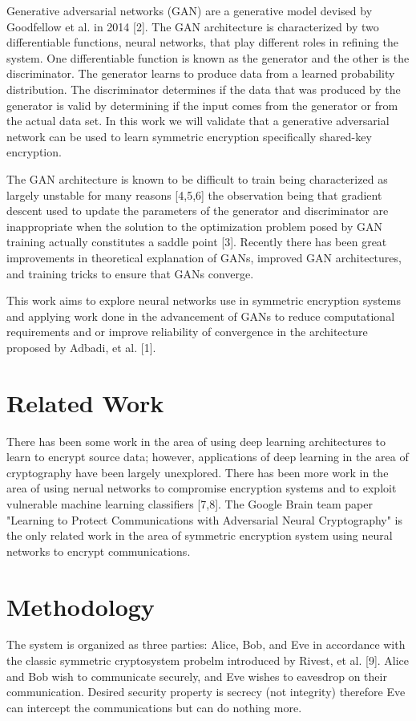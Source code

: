 \documentclass[12pt]{article}
\begin{document}
Generative adversarial networks (GAN) are a generative model devised by Goodfellow et al. in 2014 [2]. The GAN architecture is characterized by two differentiable functions, neural networks, that play different roles in refining the system. One differentiable function is known as the generator and the other is the discriminator. The generator learns to produce data from a learned probability distribution. The discriminator determines if the data that was produced by the generator is valid by determining if the input comes from the generator or from the actual data set. In this work we will validate that a generative adversarial network can be used to learn symmetric encryption specifically shared-key encryption.

The GAN architecture is known to be difficult to train being characterized as largely unstable for many reasons [4,5,6] the observation being that gradient descent used to update the parameters of the generator and discriminator are inappropriate when the solution to the optimization problem posed by GAN training actually constitutes a saddle point [3]. Recently there has been great improvements in theoretical explanation of GANs, improved GAN architectures, and training tricks to ensure that GANs converge.

This work aims to explore neural networks use in symmetric encryption systems and applying work done in the advancement of GANs to reduce computational requirements and or improve reliability of convergence in the architecture proposed by Adbadi, et al. [1].

\section{Related Work}
There has been some work in the area of using deep learning architectures to learn to encrypt source data; however, applications of deep learning in the area of cryptography have been largely unexplored. There has been more work in the area of using nerual networks to compromise encryption systems and to exploit vulnerable machine learning classifiers [7,8]. The Google Brain team paper "Learning to Protect Communications with Adversarial Neural Cryptography" is the only related work in the area of symmetric encryption system using neural networks to encrypt communications.

\section{Methodology}
The system is organized as three parties: Alice, Bob, and Eve in accordance with the classic symmetric cryptosystem probelm introduced by Rivest, et al. [9]. Alice and Bob wish to communicate securely, and Eve wishes to eavesdrop on their communication. Desired security property is secrecy (not integrity) therefore Eve can intercept the communications but can do nothing more.
\end{document}
